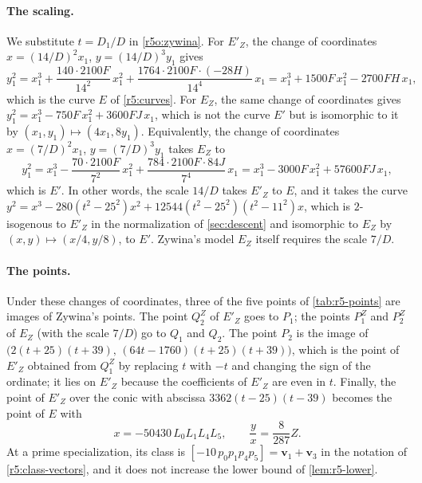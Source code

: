 \documentclass[12pt,oneside,openany]{book}
\theoremstyle{definition}
\theoremstyle{plain}
\numberwithin{equation}{chapter}
\theoremstyle{plain}
\theoremstyle{definition}
\theoremstyle{remark}
\newcommand{\sq}[1]{[#1]}
\begin{document}
\paragraph{The scaling.} We substitute $t=D_1/D$ in \eqref{r5o:zywina}. For $E'_Z$, the change of coordinates $x=(14/D)^2x_1$, $y=(14/D)^3y_1$ gives
\[
y_1^2=x_1^3+\frac{140\cdot2100F}{14^2}\,x_1^2+\frac{1764\cdot2100F\cdot(-28H)}{14^4}\,x_1=x_1^3+1500F\,x_1^2-2700FH\,x_1,
\]
which is the curve $E$ of \eqref{r5:curves}. For $E_Z$, the same change of coordinates gives $y_1^2=x_1^3-750F\,x_1^2+3600FJ\,x_1$, which is not the curve $E'$ but is isomorphic to it by $(x_1,y_1)\mapsto(4x_1,8y_1)$. Equivalently, the change of coordinates $x=(7/D)^2x_1$, $y=(7/D)^3y_1$ takes $E_Z$ to
\[
y_1^2=x_1^3-\frac{70\cdot2100F}{7^2}\,x_1^2+\frac{784\cdot2100F\cdot84J}{7^4}\,x_1=x_1^3-3000F\,x_1^2+57600FJ\,x_1,
\]
which is $E'$. In other words, the scale $14/D$ takes $E'_Z$ to $E$, and it takes the curve $y^2=x^3-280(t^2-25^2)x^2+12544(t^2-25^2)(t^2-11^2)x$, which is $2$-isogenous to $E'_Z$ in the normalization of \cref{sec:descent} and isomorphic to $E_Z$ by $(x,y)\mapsto(x/4,y/8)$, to $E'$. Zywina's model $E_Z$ itself requires the scale $7/D$.

\paragraph{The points.} Under these changes of coordinates, three of the five points of \cref{tab:r5-points} are images of Zywina's points. The point $Q^Z_2$ of $E'_Z$ goes to $P_1$; the points $P^Z_1$ and $P^Z_2$ of $E_Z$ (with the scale $7/D$) go to $Q_1$ and $Q_2$. The point $P_2$ is the image of $\big(2(t+25)(t+39),\,(64t-1760)(t+25)(t+39)\big)$, which is the point of $E'_Z$ obtained from $Q^Z_1$ by replacing $t$ with $-t$ and changing the sign of the ordinate; it lies on $E'_Z$ because the coefficients of $E'_Z$ are even in $t$. Finally, the point of $E'_Z$ over the conic with abscissa $3362(t-25)(t-39)$ becomes the point of $E$ with
\[
x=-50430\,L_0L_1L_4L_5,\qquad \frac yx=\frac8{287}Z.
\]
At a prime specialization, its class is $\sq{-10\,p_0p_1p_4p_5}=\mathbf v_1+\mathbf v_3$ in the notation of \eqref{r5:class-vectors}, and it does not increase the lower bound of \cref{lem:r5-lower}.
\end{document}
